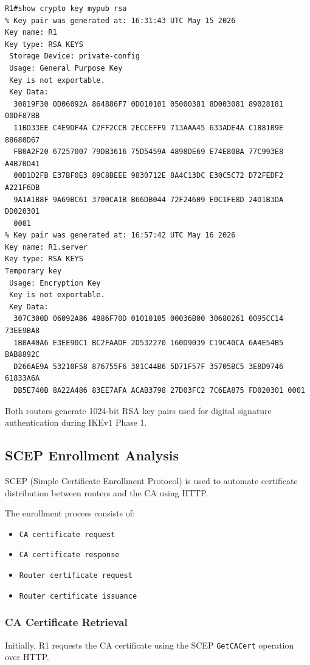 \documentclass[12pt]{article}
\begin{document}
\begin{verbatim}
R1#show crypto key mypub rsa
% Key pair was generated at: 16:31:43 UTC May 15 2026
Key name: R1
Key type: RSA KEYS
 Storage Device: private-config
 Usage: General Purpose Key
 Key is not exportable.
 Key Data:
  30819F30 0D06092A 864886F7 0D010101 05000381 8D003081 89028181 00DF87BB 
  11BD33EE C4E9DF4A C2FF2CCB 2ECCEFF9 713AAA45 633ADE4A C188109E 88680D67 
  FB0A2F20 67257007 79DB3616 75D5459A 4898DE69 E74E80BA 77C993E8 A4B70D41 
  00D1D2FB E37BF0E3 89C8BEEE 9830712E 8A4C13DC E30C5C72 D72FEDF2 A221F6DB 
  9A1A1B8F 9A69BC61 3700CA1B B66DB044 72F24609 E0C1FE8D 24D1B3DA DD020301 
  0001
% Key pair was generated at: 16:57:42 UTC May 16 2026
Key name: R1.server
Key type: RSA KEYS
Temporary key
 Usage: Encryption Key
 Key is not exportable.
 Key Data:
  307C300D 06092A86 4886F70D 01010105 00036B00 30680261 0095CC14 73EE9BA8 
  1B0A40A6 E3EE90C1 BC2FAADF 2D532270 160D9039 C19C40CA 6A4E54B5 BAB8892C 
  D266AE9A 53210F58 876755F6 381C44B6 5D71F57F 35705BC5 3E8D9746 61833A6A 
  DB5E740B 8A22A486 83EE7AFA ACAB3798 27D03FC2 7C6EA875 FD020301 0001
\end{verbatim}

Both routers generate 1024-bit RSA key pairs used for digital signature authentication during IKEv1 Phase 1.

\subsection{SCEP Enrollment Analysis}

SCEP (Simple Certificate Enrollment Protocol) is used to automate certificate distribution between routers and the CA using HTTP.

The enrollment process consists of:

\begin{itemize}
\item \texttt{CA certificate request}
\item \texttt{CA certificate response}
\item \texttt{Router certificate request}
\item \texttt{Router certificate issuance}
\end{itemize}

\subsubsection{CA Certificate Retrieval}

Initially, R1 requests the CA certificate using the SCEP \texttt{GetCACert} operation over HTTP.
\end{document}
